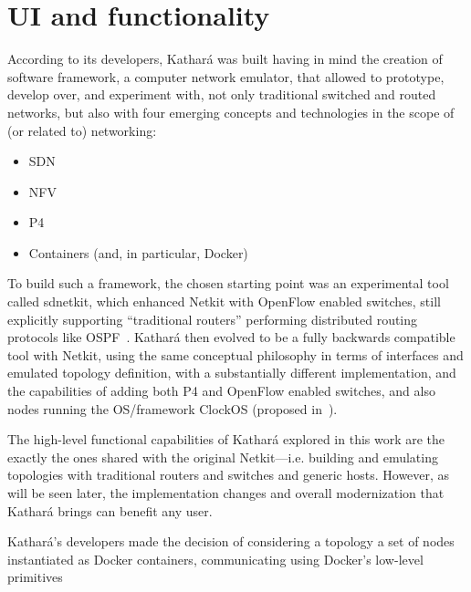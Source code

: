 \section{UI and functionality}
\label{sec:katharafunctionality}

According to its developers, Kathará was built having in mind the creation of software framework, a computer network emulator, that allowed to prototype, develop over, and experiment with, not only traditional switched and routed networks, but also with four emerging concepts and technologies in the scope of (or related to) networking:
\begin{itemize}
	\item SDN
	\item NFV
	\item P4~\cite{p4programming} %
	\item Containers (and, in particular, Docker)
\end{itemize}

To build such a framework, the chosen starting point was an experimental tool called sdnetkit, which enhanced Netkit with OpenFlow enabled switches, still explicitly supporting ``traditional routers'' performing distributed routing protocols like OSPF~\cite{sdnkit}.
Kathará then evolved to be a fully backwards compatible tool with Netkit, using the same conceptual philosophy in terms of interfaces and emulated topology definition, with a substantially different implementation, and the capabilities of adding both P4 and OpenFlow enabled switches, and also nodes running the OS/framework ClockOS (proposed in~\cite{clockos}).

The high-level functional capabilities of Kathará explored in this work are the exactly the ones shared with the original Netkit---i.e. building and emulating topologies with traditional routers and switches and generic hosts.
However, as will be seen later, the implementation changes and overall modernization that Kathará brings can benefit any user.

Kathará's developers made the decision of considering a topology a set of nodes instantiated as Docker containers, communicating using Docker's low-level primitives

